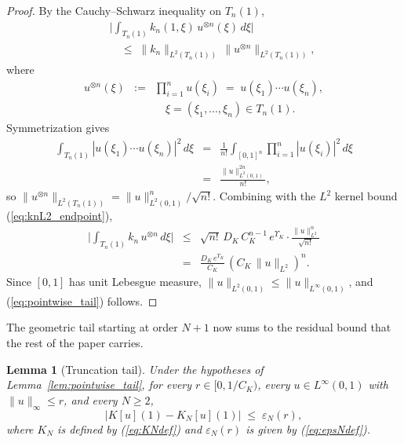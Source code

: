 \documentclass[10pt,a4paper]{amsart}
\newtheorem{lemma}{Lemma}
\newcommand{\Linf}{L^\infty}
\newcommand{\Ltwo}{L^2}
\newcommand{\eps}{\varepsilon}
\begin{document}
\begin{proof}
By the Cauchy--Schwarz inequality on $T_n(1)$,
\begin{eqnarray}
&& \biggl|\int_{T_n(1)} k_n(1,\xi)\, u^{\otimes n}(\xi)\, d\xi\biggr| \nonumber \\
&& \quad \le\; \|k_n\|_{\Ltwo(T_n(1))}\, \|u^{\otimes n}\|_{\Ltwo(T_n(1))},
\label{eq:CS_step}
\end{eqnarray}
where 
\begin{eqnarray}
u^{\otimes n}(\xi) &:=& \prod_{i=1}^n u(\xi_i) \;=\; u(\xi_1)\cdots u(\xi_n), \nonumber \\
&& \quad \xi = (\xi_1,\ldots,\xi_n) \in T_n(1).
\label{eq:utensor}
\end{eqnarray}
Symmetrization gives
\begin{eqnarray}
\int_{T_n(1)} |u(\xi_1)\cdots u(\xi_n)|^2\, d\xi &=& \frac{1}{n!}\int_{[0,1]^n} \prod_{i=1}^n |u(\xi_i)|^2\, d\xi \nonumber \\
&=& \frac{\|u\|_{\Ltwo(0,1)}^{2n}}{n!},
\label{eq:symmetrization}
\end{eqnarray}
so $\|u^{\otimes n}\|_{\Ltwo(T_n(1))} = \|u\|_{\Ltwo(0,1)}^n / \sqrt{n!}$. Combining with the $\Ltwo$ kernel bound (\ref{eq:knL2_endpoint}),
\begin{eqnarray}
\biggl|\int_{T_n(1)} k_n\, u^{\otimes n}\, d\xi\biggr| &\le& \sqrt{n!}\, D_K\, C_K^{n-1}\, e^{\Upsilon_K}\cdot\frac{\|u\|_{\Ltwo}^n}{\sqrt{n!}} \nonumber \\
&=& \frac{D_K\, e^{\Upsilon_K}}{C_K}\,(C_K\,\|u\|_{\Ltwo})^n.
\label{eq:combined_bound}
\end{eqnarray}
Since $[0,1]$ has unit Lebesgue measure, $\|u\|_{\Ltwo(0,1)} \le \|u\|_{\Linf(0,1)}$, and (\ref{eq:pointwise_tail}) follows.
\end{proof}

The geometric tail starting at order $N+1$ now sums to the residual bound that the rest of the paper carries.

\begin{lemma}[Truncation tail]\label{lem:trunc_tail}
Under the hypotheses of Lemma~\ref{lem:pointwise_tail}, for every $r \in [0, 1/C_K)$, every $u \in \Linf(0,1)$ with $\|u\|_\infty \le r$, and every $N \ge 2$,
\begin{equation}
\bigl|K[u](1) - K_N[u](1)\bigr| \;\le\; \eps_N(r),
\label{eq:trunc_tail}
\end{equation}
where $K_N$ is defined by (\ref{eq:KNdef}) and $\eps_N(r)$ is given by (\ref{eq:epsNdef}).
\end{lemma}
\end{document}
